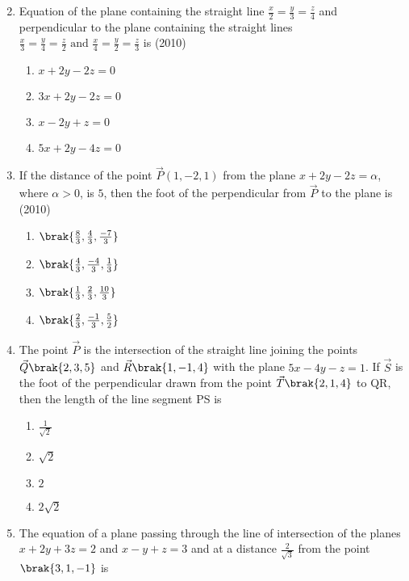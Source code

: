 \begin{enumerate}
\begin{multicols}{2}
\begin{enumerate}
    	\end{enumerate}
    \end{multicols}
    \item Equation of the plane containing the straight line $\frac{x}{2}=\frac{y}{3}=\frac{z}{4}$ and perpendicular to the plane containing the straight lines $\frac{x}{3}=\frac{y}{4}=\frac{z}{2} \text{ and } \frac{x}{4}=\frac{y}{2}=\frac{z}{3}$ is 
    \hfill{(2010)}
    \begin{enumerate}
    	\item $x+2y-2z=0$
    	\item $3x+2y-2z=0$
    	\item $x-2y+z=0$
    	\item $5x+2y-4z=0$
    \end{enumerate}
    \item If the distance of the point $\vec{P}(1,-2,1)$ from the plane $x+2y-2z=\alpha$, where $\alpha>0$, is $5$, then the foot of the perpendicular from $\vec{P}$ to the plane is
    \hfill{(2010)}
    \begin{enumerate}
    	\item $\brak{\frac{8}{3}, \frac{4}{3}, \frac{-7}{3}}$
    	\item $\brak{\frac{4}{3}, \frac{-4}{3}, \frac{1}{3}}$
    	\item $\brak{\frac{1}{3}, \frac{2}{3}, \frac{10}{3}}$
    	\item $\brak{\frac{2}{3}, \frac{-1}{3}, \frac{5}{2}}$
    \end{enumerate}
	 \item %
		 The point $\vec{P}$ is the intersection of the straight line joining the points $\vec{Q}\brak{2,3,5}$ and $\vec{R}\brak{1,-1,4}$ with the plane $5x-4y-z=1$. If $\vec{S}$ is the foot of the perpendicular drawn from the point $\vec{T}\brak{2,1,4}$ to QR, then the length of the line segment PS is \hfill{}\\
\begin{enumerate}
	\item $\frac{1}{\sqrt{2}}$           
	\item $\sqrt{2}$                   
        \item $2$           
	\item $2\sqrt{2}$\\ 
\end{enumerate}
         \item %
		 The equation of a plane passing through the line of intersection of the planes $x+2y+3z=2$ and $x-y+z=3$ and at a distance $\frac{2}{\sqrt{3}}$ from the point $\brak{3,1,-1}$ is \hfill{}\\

\end{enumerate}
